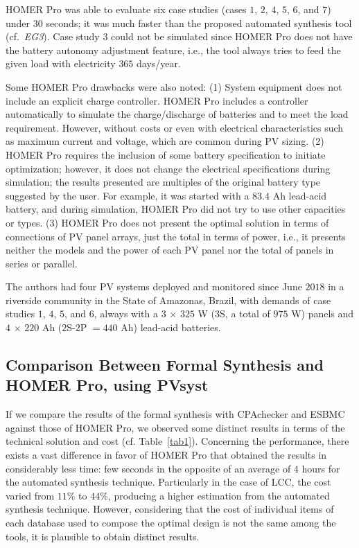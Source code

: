 \documentclass[runningheads]{llncs}
\begin{document}
HOMER Pro was able to evaluate six case studies (cases $1$, $2$, $4$, $5$, $6$, and $7$) under $30$ seconds; it was much faster than the proposed automated synthesis tool (cf.~\textit{EG3}). Case study $3$ could not be simulated since HOMER Pro does not have the battery autonomy adjustment feature, i.e., the tool always tries to feed the given load with electricity $365$ days/year. 

Some HOMER Pro drawbacks were also noted: (1) System equipment does not include an explicit charge controller. HOMER Pro includes a controller automatically to simulate the charge/discharge of batteries and to meet the load requirement. However, without costs or even with electrical characteristics such as maximum current and voltage, which are common during PV sizing. (2) HOMER Pro requires the inclusion of some battery specification to initiate optimization; however, it does not change the electrical specifications during simulation; the results presented are multiples of the original battery type suggested by the user. For example, it was started with a $83.4$ Ah lead-acid battery, and during simulation, HOMER Pro did not try to use other capacities or types. (3) HOMER Pro does not present the optimal solution in terms of connections of PV panel arrays, just the total in terms of power, i.e., it presents neither the models and the power of each PV panel nor the total of panels in series or parallel.

The authors had four PV systems deployed and monitored since June $2018$ in a riverside community in the State of Amazonas, Brazil, with demands of case studies $1$, $4$, $5$, and $6$, always with a $3$ $\times$ $325$ W ($3$S, a total of $975$ W) panels and $4$ $\times$ $220$ Ah ($2$S-$2$P $= 440$ Ah) lead-acid batteries.

\subsection{Comparison Between Formal Synthesis and HOMER Pro, using PVsyst}

If we compare the results of the formal synthesis with CPAchecker and ESBMC against those of HOMER Pro, we observed some distinct results in terms of the technical solution and cost (cf. Table~\ref{tab1}). Concerning the performance, there exists a vast difference in favor of HOMER Pro that obtained the results in considerably less time: few seconds in the opposite of an average of $4$ hours for the automated synthesis technique.
%
Particularly in the case of LCC, the cost varied from $11$\% to $44$\%, producing a higher estimation from the automated synthesis technique. However, considering that the cost of individual items of each database used to compose the optimal design is not the same among the tools, it is plausible to obtain distinct results.
\end{document}
